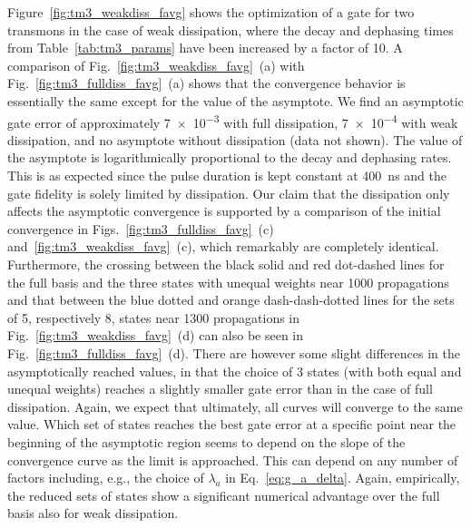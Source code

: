 Figure~\ref{fig:tm3_weakdiss_favg} shows the optimization of
a \sqrtISWAP{} gate for two transmons in the
case of weak dissipation, where the decay and dephasing times from
Table~\ref{tab:tm3_params} have been increased by a factor of 10. A comparison of
Fig.~\ref{fig:tm3_weakdiss_favg}~(a) with
Fig.~\ref{fig:tm3_fulldiss_favg}~(a) shows that the
convergence
behavior is essentially the same except for the value of the asymptote. We find
an asymptotic gate error of approximately \num{7e-3} with full
dissipation, \num{7e-4} with weak dissipation, and no asymptote without
dissipation (data not shown). The value of the asymptote is logarithmically
proportional to the decay and dephasing rates. This is as expected
since the pulse duration is kept constant at \SI{400}{ns} and the gate
fidelity is solely limited by
dissipation. Our claim that the dissipation only affects the asymptotic
convergence is supported by a comparison of the initial convergence
in Figs.~\ref{fig:tm3_fulldiss_favg}~(c)
and~\ref{fig:tm3_weakdiss_favg}~(c),
which remarkably are completely identical.
Furthermore, the crossing between the black solid and red dot-dashed lines for
the full basis and the three states with unequal weights near 1000 propagations
and that between the blue dotted and orange dash-dash-dotted lines for the sets
of 5, respectively 8, states near
1300 propagations in Fig.~\ref{fig:tm3_weakdiss_favg}~(d) can
also be seen in Fig.~\ref{fig:tm3_fulldiss_favg}~(d).
There are however some slight differences in the asymptotically reached values,
in that the choice of 3 states (with both equal and unequal weights) reaches a slightly
smaller gate error than in the case of full dissipation. Again, we expect that
ultimately, all curves will converge to the same value. Which set of states
reaches the best gate error at a specific point near the beginning of the
asymptotic region seems to depend on the slope of the convergence curve as the
limit is approached. This can depend on any number of factors
including, e.g., the choice
of $\lambda_a$ in Eq.~\eqref{eq:g_a_delta}. Again, empirically, the reduced sets of
states show a significant numerical advantage over the full basis also
for weak dissipation.

